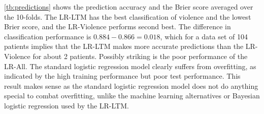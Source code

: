 \documentclass[a4paper,11pt]{article}
\begin{document}
\autoref{tb:predictions} shows the prediction accuracy and the Brier score averaged over the 10-folds.
The LR-LTM has the best classification of violence and the lowest Brier score, and the LR-Violence performs second best.
The difference in classification performance is $0.884 - 0.866 = 0.018$, which for a data set of 104 patients implies that the LR-LTM makes more accurate predictions than the LR-Violence for about 2 patients.
Possibly striking is the poor performance of the LR-All.
The standard logistic regression model clearly suffers from overfitting, as indicated by the high training performance but poor test performance. This result makes sense as the standard logistic regression model does not do anything special to combat overfitting, unlike the machine learning alternatives or Bayesian logistic regression used by the LR-LTM.
\end{document}
